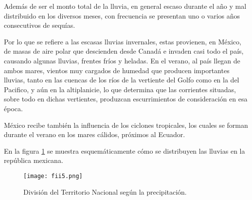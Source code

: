 Además de ser el monto total de la lluvia, en general escaso durante el año y mal distribuido en los diversos meses, con frecuencia se presentan uno o varios años consecutivos de sequías.

Por lo que se refiere a las escasas lluvias invernales, estas provienen, en México, de masas de aire polar que descienden desde Canadá e invaden casi todo el país, causando algunas lluvias, frentes fríos y heladas. En el verano, al país llegan de ambos mares, vientos muy cargados de humedad que producen importantes lluvias, tanto en las cuencas de los ríos de la vertiente del Golfo como en la del Pacifico, y aún en la altiplanicie, lo que determina que las corrientes situadas, sobre todo en dichas vertientes, produzcan escurrimientos de consideración en esa época.

México recibe también la influencia de los ciclones tropicales, los cuales se forman durante el verano en los mares cálidos, próximos al Ecuador.

En la figura \ref{fii5} se muestra esquemáticamente cómo se distribuyen las lluvias en la república mexicana.
\begin{figure}[h!]
	\centerline{\texttt{[image: fii5.png]}}
	\caption{División del Territorio Nacional según la precipitación.}
	\label{fii5}
\end{figure}
